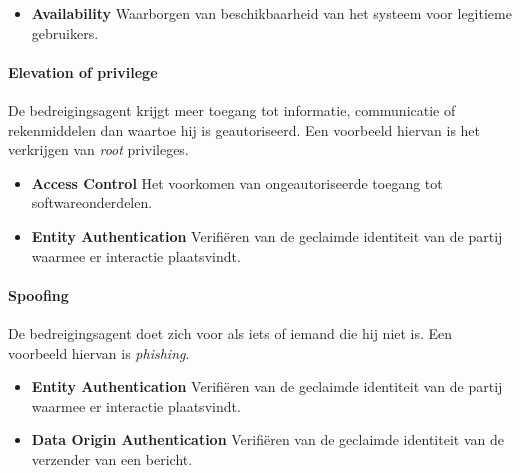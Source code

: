 \documentclass[../main.tex]{subfiles}
\begin{document}
\begin{itemize}
	\item \textbf{Availability} Waarborgen van beschikbaarheid van het systeem voor legitieme gebruikers.
\end{itemize}

\paragraph{Elevation of privilege}
De bedreigingsagent krijgt meer toegang tot informatie, communicatie of rekenmiddelen dan waartoe hij is geautoriseerd. Een voorbeeld hiervan is het verkrijgen van \textit{root} privileges.

\begin{itemize}
	\item \textbf{Access Control} Het voorkomen van ongeautoriseerde toegang tot softwareonderdelen.
	\item \textbf{Entity Authentication} Verifi\"eren van de geclaimde identiteit van de partij waarmee er interactie plaatsvindt.
\end{itemize}

\paragraph{Spoofing}
De bedreigingsagent doet zich voor als iets of iemand die hij niet is. Een voorbeeld hiervan is \textit{phishing}.

\begin{itemize}
	\item \textbf{Entity Authentication} Verifi\"eren van de geclaimde identiteit van de partij waarmee er interactie plaatsvindt.
	\item \textbf{Data Origin Authentication} Verifi\"eren van de geclaimde identiteit van de verzender van een bericht.
\end{itemize}
\end{document}
